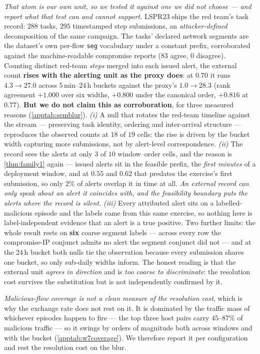 \documentclass[conference]{IEEEtran}
\begin{document}
\emph{That atom is our own unit, so we tested it against one we did not choose --- and report what
that test can and cannot support.} LSPR23 ships the red team's task record: $288$ tasks, $295$
timestamped step submissions, an \emph{attacker-defined} decomposition of the same campaign. The
tasks' declared network segments are the dataset's own per-flow \texttt{seg} vocabulary under a
constant prefix, corroborated against the machine-readable compromise reports ($83$ agree, $0$
disagree). Counting distinct red-team \emph{steps} merged into each issued alert, the external count
\textbf{rises with the alerting unit as the proxy does}: at $0.70$ it runs $4.3\to27.0$ across
$5$\,min--$24$\,h buckets against the proxy's $1.0\to28.3$ (rank agreement $+1.000$ over six widths,
$+0.800$ under the canonical order, $+0.816$ at $0.77$). \textbf{But we do not claim this as
corroboration}, for three measured reasons (\cref{apptab:semblur}). \emph{(i)} A null that rotates the
red-team timeline against the stream --- preserving task identity, ordering and inter-arrival
structure --- reproduces the observed counts at $18$ of $19$ cells: the rise is driven by the bucket
width capturing more submissions, not by alert-level correspondence. \emph{(ii)} The record sees the
alerts at only $3$ of $10$ window--order cells, and the reason is \cref{thm:family1} again --- issued
alerts sit in the feasible prefix, the \emph{first minutes} of a deployment window, and at $0.55$ and
$0.62$ that predates the exercise's first submission, so only $2\%$ of alerts overlap it in time at
all. \emph{An external record can only speak about an alert it coincides with, and the feasibility
boundary puts the alerts where the record is silent.} \emph{(iii)} Every attributed alert sits on a
labelled-malicious episode and the labels came from this same exercise, so nothing here is
label-independent evidence that an alert is a true positive. Two further limits: the whole result
rests on \textbf{six} coarse segment labels --- across every row the compromise-IP conjunct admits no
alert the segment conjunct did not --- and at the $24$\,h bucket both nulls tie the observation
because every submission shares one bucket, so only sub-daily widths inform. The honest reading is
that the external unit \emph{agrees in direction} and is \emph{too coarse to discriminate}: the resolution cost survives
the substitution but is not independently confirmed by it.

\emph{Malicious-flow coverage is not a clean measure of the resolution cost}, which is why the
exchange rate does not rest on it. It is dominated by the traffic mass of whichever episodes happen to
fire --- the top three host pairs carry $45$--$87\%$ of malicious traffic --- so it swings by orders of
magnitude both across windows and with the bucket (\cref{apptab:w7coverage}). We therefore report it
per configuration and rest the resolution cost on the blur.
\end{document}
